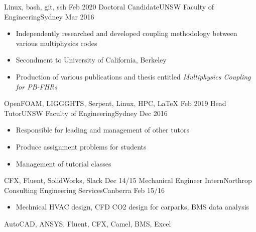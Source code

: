\begin{experiences}
{\begin{itemize}
                    \end{itemize}
                    }
                    {Linux, bash, git, ssh}
  \emptySeparator
  \experience
    {Feb 2020} {Doctoral Candidate}{UNSW Faculty of Engineering}{Sydney}
    {Mar 2016} {
                    \begin{itemize}
                        \item Independently researched and developed coupling methodology between various multiphysics codes
                        \item Secondment to University of California, Berkeley
                        \item Production of various publications and thesis entitled \textit{Multiphysics Coupling for PB-FHRs}
                    \end{itemize}
                    }
                    {OpenFOAM, LIGGGHTS, Serpent, Linux, HPC, \LaTeX}
  \emptySeparator
  \experience
    {Feb 2019} {Head Tutor}{UNSW Faculty of Engineering}{Sydney}
    {Dec 2016} {
                    \begin{itemize}
                        \item Responsible for leading and management of other tutors
                        \item Produce assignment problems for students
                        \item Management of tutorial classes
                    \end{itemize}
                    }
                    {CFX, Fluent, SolidWorks, Slack}
    \emptySeparator
  \experience
    {Dec 14/15} {Mechanical Engineer Intern}{Northrop Consulting Engineering Services}{Canberra}
    {Feb 15/16} {
                    \begin{itemize}
                        \item Mechnical HVAC design, CFD CO2 design for carparks, BMS data analysis
                    \end{itemize}
                }
               {AutoCAD, ANSYS, Fluent, CFX, Camel, BMS, Excel}
\end{experiences}

